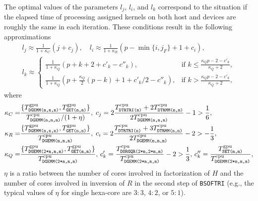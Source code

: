 \documentclass{llncs}
\newcommand{\Bsoftri}{\texttt{BSOFTRI}\xspace}
\begin{document}
The optimal values of the parameters $l_j$, $l_i$, and $l_k$ 
correspond to the situation 
if the elapsed time of processing assigned kernels
on both host and devices are roughly the same in each iteration. 
These conditions result in the following approximations 
\begin{align}
  \label{eq:l_j}
  l_j \approx \frac{1}{1 + \kappa_C} \left(j + c_j \right)
  , \quad %
  l_i \approx \frac{1}{1 + \kappa_R} \left( p-\min\{i,j_F\}+1 + c_i \right), 
  \\
  \label{eq:l_k}
    l_k \approx 
    \begin{cases}
        \displaystyle \frac{1}{1 + \kappa_Q} \left( p+k + 2 +c'_k - c''_k\right),
      & \mbox{if } k \leq \displaystyle \frac{ \kappa_{Q} p -2 - c'_{k}}{\kappa_{Q} + 2},\\ %
        \displaystyle \frac{1}{1 + \kappa_Q} \left(p  + \frac{\kappa_Q}{2}(p-k) + 1 + c'_k/2 - c''_k\right),
      & \mbox{if } k > \displaystyle \frac{ \kappa_{Q} p -2 - c'_{k}}{\kappa_{Q} + 2}, %
    \end{cases}
\end{align}
where 
\begin{align*}
  \kappa_C =& \frac{\{T_{\texttt{DGEMM(n,n,n)}}^{\rm gpu},T^{\rm gpu}_{\texttt{GET(n,n)}}\}}{T^{\rm cpu}_{\texttt{DGEMM(n,n,n)}} / (1 + \eta)} 
  , \;
  c_j = 2 \frac{T^{\rm cpu}_{\texttt{DTRTRI(n)}} + 2 T^{\rm cpu}_{\texttt{DTRMM(n,n)}}}{2 T^{\rm cpu}_{\texttt{DGEMM(n,n,n)}}} - 1 > \frac{1}{6}
  ,\;
  \\
  \kappa_R =& \frac{\{T_{\texttt{DGEMM(n,n,n)}}^{\rm gpu},T^{\rm gpu}_{\texttt{GET(n,n)}}\}}{T^{\rm cpu}_{\texttt{DGEMM(n,n,n)}}} 
  , \;
  c_i = 
  2 \frac{T^{\rm cpu}_{\texttt{DTRTRI(n)}} + 3T^{\rm cpu}_{\texttt{DTRMM(n,n)}}}{2 T^{\rm cpu}_{\texttt{DGEMM(n,n,n)}}} - 2 > -\frac{1}{3},
  \\
  \kappa_Q  =& \frac{\{T_{\texttt{DGEMM(2*n,n,n)}}^{\rm gpu},T^{\rm gpu}_{\texttt{GET(n,n)}}\}}{T^{\rm cpu}_{\texttt{DGEMM(2*n,n,n)}}} 
  , \,
  c'_k  = \frac{T^{\rm cpu}_\texttt{DORGQR(2*n,2*n,n)}}{T^{\rm cpu}_\texttt{DGEMM(2*n,n,n)}} - 2 > \frac{1}{3}
  , \,
  c''_k = {%
    \frac{T^{\rm gpu}_{\texttt{SET(n,n)}}}{%
    T_{\texttt{DGEMM(2*n,n,n)}}^{\rm cpu}}}
  ,
\end{align*}
$\eta$ is a ratio between the number of cores involved in factorization of $H$
and the number of cores involved in inversion of $R$ in the second step of \Bsoftri 
(e.g., the typical values of $\eta$ for single hexa-core are $3:3$, $4:2$, or $5:1$).
\end{document}
